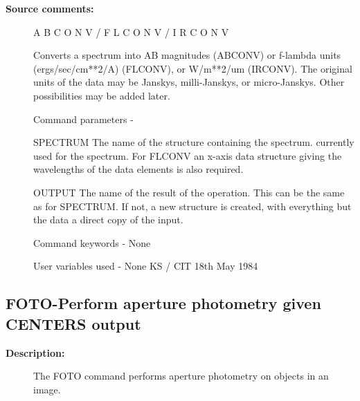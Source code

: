 \begin{description}
\begin{description}
\item [\textbf{Source comments:}]
\begin{terminalv}
 A B C O N V  /  F L C O N V  /  I R C O N V

 Converts a spectrum into AB magnitudes (ABCONV) or f-lambda
 units (ergs/sec/cm**2/A) (FLCONV), or W/m**2/um (IRCONV).
 The original units of the
 data may be Janskys, milli-Janskys, or micro-Janskys.  Other
 possibilities may be added later.

 Command parameters -

 SPECTRUM The name of the structure containing the spectrum.
          currently used for the spectrum.  For FLCONV
          an x-axis data structure giving the wavelengths of the
          data elements is also required.

 OUTPUT   The name of the result of the operation.  This can
          be the same as for SPECTRUM. If not, a new structure
          is created, with everything but the data a direct
          copy of the input.

 Command keywords  - None

 User variables used - None
                                  KS / CIT 18th May 1984
\end{terminalv}
\end{description}
\subsection{FOTO-\label{FOTO}Perform aperture photometry given CENTERS output}
\begin{description}

\item [\textbf{Description:}]
 The FOTO command performs aperture photometry on objects
 in an image.


\end{description}
\end{description}
